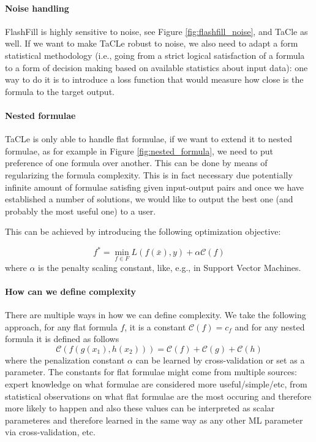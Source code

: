 \pubrev
\paragraph{Noise handling} FlashFill is highly sensitive to noise,
see Figure \ref{fig:flashfill_noise},
and TaCle as well. If we want to make TaCLe robust to noise, we also need to adapt a form
statistical methodology (i.e., going from a strict logical satisfaction of a formula to a form of decision making based on available statistics about input data): one way to do it is to introduce a loss
function that would measure how close is the formula to the target output.

\paragraph{Nested formulae} TaCLe is only able to handle flat
formulae, if we want to extend it to nested formulae, as for
example in Figure \ref{fig:nested_formula}, we need to
put preference of one formula over another. This can be done by means 
of regularizing the formula complexity. This is in fact necessary due potentially infinite amount of formulae satisfing given input-output pairs and once we have established a number of solutions, we would like to output the best one (and probably the most useful one) to a user.
\pubrevend

This can be achieved by introducing the following optimization
objective:

  \begin{equation*}
    f^* = \min_{f \in F}{L(f(\bar x),y) + \alpha \mathcal{C}(f)}
  \end{equation*}
  where $\alpha$ is the penalty scaling constant, like, e.g., in Support Vector Machines.

\paragraph{How can we define complexity}
There are multiple ways in how we can define complexity. We take the following approach, for any flat formula $f$, it is a constant $\mathcal{C}(f) = c_f $
     and for any nested formula it is defined as follows
       \begin{equation*}
       \mathcal{C}(f(g(x_1),h(x_2))) = \mathcal{C}(f) + \mathcal{C}(g) + \mathcal{C}(h)
       \end{equation*}
where the penalization constant $\alpha$ can be learned by cross-validation or set as a parameter. \pubrev The constants for flat formulae might come from multiple sources: expert knowledge on what formulae are considered more useful/simple/etc, from statistical observations on what flat formulae are the most occuring and therefore more likely to happen and also these values can be interpreted as scalar parameteres and therefore learned in the same way as any other ML parameter via cross-validation, etc.\pubrevend

